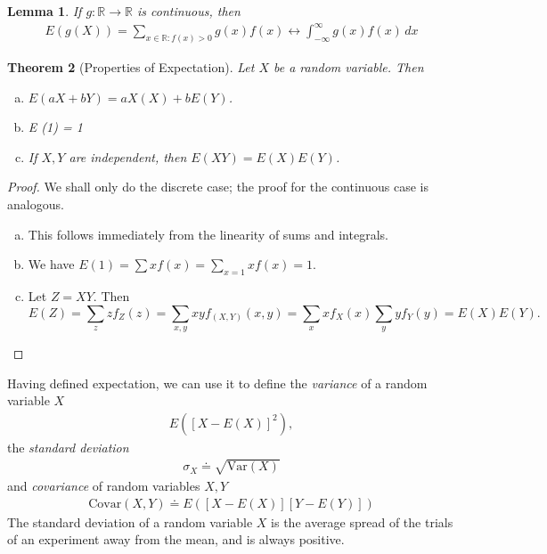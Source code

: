 \documentclass[12pt]{article}
\newcommand{\rr}{\mathbb{R}}
\newcommand{\var}{\text{Var}}
\newcommand{\covar}{\text{Covar}}
\theoremstyle{plain}
\newtheorem{theorem}{Theorem}
\newtheorem{lemma}[theorem]{Lemma}
\theoremstyle{definition}
\theoremstyle{remark}
\numberwithin{equation}{section}  %
\begin{document}
\begin{lemma}
	If $g: \rr \to \rr$ is continuous, then
	\begin{align*}
		E(g(X)) = \sum_{x \in \rr: f(x) > 0} g(x) f(x) \longleftrightarrow
		\int_{-\infty}^{\infty} g(x) f(x) \, dx
	\end{align*}
\end{lemma}
\begin{theorem}[Properties of Expectation]
	Let $X$ be a random variable. Then
	\begin{enumerate}[(a)]
		\item $E(a X + b Y) = a X(X) + b E(Y)$.
		\item E (1) = 1
		\item If $X,Y$ are independent, then $E(XY) = E(X)E(Y)$.
	\end{enumerate}
\end{theorem}
\begin{proof}
	We shall only do the discrete case; the proof for the continuous case is
	analogous.
	\begin{enumerate}[(a)]
		\item This follows immediately from the linearity of sums and integrals.
		\item
			We have $E(1) = \sum x f(x) = \sum_{x = 1} x f(x) = 1$.
		\item
			Let $Z = XY$. Then
			\[E(Z) = \sum_{z} z f_Z(z) = \sum_{x,y} x y f_{(X,Y)}(x,y) = \sum_x 
				x f_X(x)
				\sum_y y f_Y(y) = E(X) E(Y).\]
	\end{enumerate}
\end{proof}
Having defined expectation, we can use it to define the
\emph{variance} of a random variable $X$
\begin{align*}
	E({[X - E(X)]}^2),
\end{align*}
the \emph{standard deviation}
\begin{align*}
	\sigma_X \doteq \sqrt{\var(X)}
\end{align*}
and \emph{covariance} of random variables $X, Y$
\begin{align*}
	\covar(X,Y) \doteq E([X - E(X)][Y - E(Y)])
\end{align*}
The standard deviation of a random variable $X$ is the average spread of the
trials of an experiment away from the mean, and is always positive. 
\end{document}
